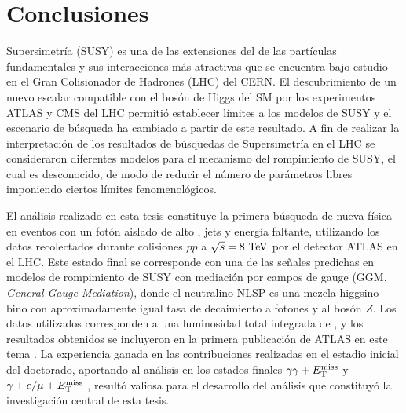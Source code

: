 \chapter{Conclusiones}\label{cap:conclusiones}

Supersimetría (SUSY) es una de las extensiones del {\SM} de las partículas
fundamentales y sus interacciones más atractivas que se encuentra bajo estudio en el
Gran Colisionador de Hadrones (LHC) del CERN. El descubrimiento de un nuevo
escalar compatible con el bosón de Higgs del SM por los experimentos ATLAS
\cite{Aad:2012tfa} y CMS del LHC permitió establecer límites a los modelos de SUSY y el
escenario de búsqueda ha cambiado a partir de este resultado. A fin de realizar
la interpretación de los resultados de búsquedas de Supersimetría en el LHC se
consideraron diferentes modelos para el mecanismo del rompimiento de SUSY, el
cual es desconocido, de modo de reducir el número de parámetros libres
imponiendo ciertos límites fenomenológicos.

El análisis realizado en esta tesis constituye la primera búsqueda de nueva
física en eventos con un fotón aislado de alto {\pt}, jets y energía faltante,
utilizando los datos recolectados durante colisiones $pp$ a $\sqrt{s}=8 \tev$
por el detector ATLAS en el LHC. Este estado final se corresponde con una de las se\~nales
predichas en modelos de rompimiento de SUSY con mediación por campos de gauge (GGM, \emph{General Gauge
  Mediation}), donde el neutralino NLSP es una mezcla higgsino-bino con
aproximadamente igual tasa de decaimiento a fotones y al bosón $Z$. Los datos
utilizados corresponden a una luminosidad total integrada de {\ilumi}, y los
resultados obtenidos se incluyeron en la primera publicación de ATLAS en este
tema \cite{Aad:2015hea}. La experiencia ganada en las contribuciones realizadas
en el estadio inicial del doctorado, aportando al análisis en los estados
finales $\gamma\gamma+E_{\mathrm{T}}^{\mathrm{miss}}$ \cite{Aad2012519,ATLAS-CONF-2014-001} y
$\gamma+e/\mu+E_{\mathrm{T}}^{\mathrm{miss}}$ \cite{ATLAS-CONF-2012-144}, resultó valiosa para el
desarrollo del análisis que constituyó la investigación central de esta tesis.



